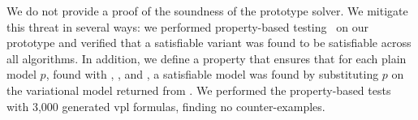 We do not provide a proof of the soundness of the prototype solver. We mitigate
this threat in several ways: we performed property-based
testing~\cite{quickcheck} on our prototype and verified that a satisfiable
variant was found to be satisfiable across all algorithms. In addition, we
define a property that ensures that for each plain model $p$, found with
\pTov{}, \vTop{}, and \pTop{}, a satisfiable model  was found by
substituting $p$ on the variational model returned from \vsat{}. We performed
the property-based tests with 3,000 generated \ac{vpl} formulas, finding no
counter-examples.



